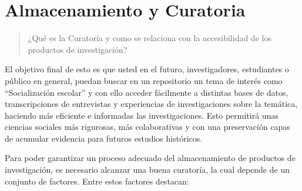 \documentclass[
  14pt,
]{book}
\begin{document}
\hypertarget{almacenamiento-y-curatoria}{%
\chapter{Almacenamiento y Curatoria}\label{almacenamiento-y-curatoria}}

\begin{quote}
¿Qué es la Curatoría y como se relaciona con la accesibilidad de los productos de investigación?
\end{quote}

El objetivo final de esto es que usted en el futuro, investigadores, estudiantes o público en general, puedan buscar en un repositorio un tema de interés como ``Socialización escolar'' y con ello acceder fácilmente a distintas bases de datos, transcripciones de entrevistas y experiencias de investigaciones sobre la temática, haciendo más eficiente e informadas las investigaciones. Esto permitirá unas ciencias sociales más rigurosas, más colaborativas y con una preservación capas de acumular evidencia para futuros estudios históricos.

Para poder garantizar un proceso adecuado del almacenamiento de productos de investigación, es necesario alcanzar una buena curatoría, la cual depende de un conjunto de factores. Entre estos factores destacan:
\end{document}
